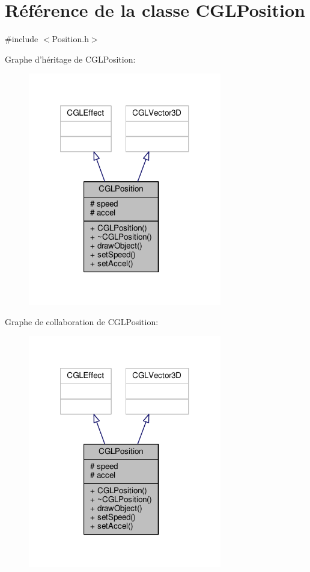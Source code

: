\hypertarget{class_c_g_l_position}{\section{Référence de la classe C\-G\-L\-Position}
\label{class_c_g_l_position}
}


{\ttfamily \#include $<$Position.\-h$>$}



Graphe d'héritage de C\-G\-L\-Position\-:
\nopagebreak
\begin{figure}[H]
\begin{center}
\leavevmode
\includegraphics[width=239pt]{d7/d46/class_c_g_l_position__inherit__graph}
\end{center}
\end{figure}


Graphe de collaboration de C\-G\-L\-Position\-:
\nopagebreak
\begin{figure}[H]
\begin{center}
\leavevmode
\includegraphics[width=239pt]{df/df1/class_c_g_l_position__coll__graph}
\end{center}
\end{figure}
